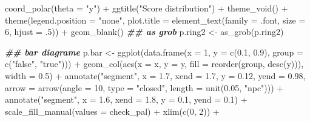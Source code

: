 \documentclass[
]{article}
\newenvironment{Shaded}{\begin{snugshade}}{\end{snugshade}}
\newcommand{\AttributeTok}[1]{\textcolor[rgb]{0.77,0.63,0.00}{#1}}
\newcommand{\DecValTok}[1]{\textcolor[rgb]{0.00,0.00,0.81}{#1}}
\newcommand{\DocumentationTok}[1]{\textcolor[rgb]{0.56,0.35,0.01}{\textbf{\textit{#1}}}}
\newcommand{\FloatTok}[1]{\textcolor[rgb]{0.00,0.00,0.81}{#1}}
\newcommand{\FunctionTok}[1]{\textcolor[rgb]{0.00,0.00,0.00}{#1}}
\newcommand{\NormalTok}[1]{#1}
\newcommand{\OtherTok}[1]{\textcolor[rgb]{0.56,0.35,0.01}{#1}}
\newcommand{\SpecialCharTok}[1]{\textcolor[rgb]{0.00,0.00,0.00}{#1}}
\newcommand{\StringTok}[1]{\textcolor[rgb]{0.31,0.60,0.02}{#1}}
\begin{document}
\begin{Shaded}
\begin{Highlighting}[]
  \FunctionTok{coord\_polar}\NormalTok{(}\AttributeTok{theta =} \StringTok{"y"}\NormalTok{) }\SpecialCharTok{+}
  \FunctionTok{ggtitle}\NormalTok{(}\StringTok{"Score distribution"}\NormalTok{) }\SpecialCharTok{+}
  \FunctionTok{theme\_void}\NormalTok{() }\SpecialCharTok{+}
  \FunctionTok{theme}\NormalTok{(}\AttributeTok{legend.position =} \StringTok{"none"}\NormalTok{,}
    \AttributeTok{plot.title =} \FunctionTok{element\_text}\NormalTok{(}\AttributeTok{family =}\NormalTok{ .font, }\AttributeTok{size =} \DecValTok{6}\NormalTok{, }\AttributeTok{hjust =}\NormalTok{ .}\DecValTok{5}\NormalTok{)) }\SpecialCharTok{+}
  \FunctionTok{geom\_blank}\NormalTok{()}
\DocumentationTok{\#\# as grob}
\NormalTok{p.ring2 }\OtherTok{\textless{}{-}} \FunctionTok{as\_grob}\NormalTok{(p.ring2)}

\DocumentationTok{\#\# bar diagrame}
\NormalTok{p.bar }\OtherTok{\textless{}{-}} \FunctionTok{ggplot}\NormalTok{(}\FunctionTok{data.frame}\NormalTok{(}\AttributeTok{x =} \DecValTok{1}\NormalTok{, }\AttributeTok{y =} \FunctionTok{c}\NormalTok{(}\FloatTok{0.1}\NormalTok{, }\FloatTok{0.9}\NormalTok{), }\AttributeTok{group =} \FunctionTok{c}\NormalTok{(}\StringTok{"false"}\NormalTok{, }\StringTok{"true"}\NormalTok{))) }\SpecialCharTok{+}
  \FunctionTok{geom\_col}\NormalTok{(}\FunctionTok{aes}\NormalTok{(}\AttributeTok{x =}\NormalTok{ x, }\AttributeTok{y =}\NormalTok{ y, }\AttributeTok{fill =} \FunctionTok{reorder}\NormalTok{(group, }\FunctionTok{desc}\NormalTok{(y))), }\AttributeTok{width =} \FloatTok{0.5}\NormalTok{) }\SpecialCharTok{+}
  \FunctionTok{annotate}\NormalTok{(}\StringTok{"segment"}\NormalTok{, }\AttributeTok{x =} \FloatTok{1.7}\NormalTok{, }\AttributeTok{xend =} \FloatTok{1.7}\NormalTok{, }\AttributeTok{y =} \FloatTok{0.12}\NormalTok{, }\AttributeTok{yend =} \FloatTok{0.98}\NormalTok{,}
    \AttributeTok{arrow =} \FunctionTok{arrow}\NormalTok{(}\AttributeTok{angle =} \DecValTok{10}\NormalTok{, }\AttributeTok{type =} \StringTok{"closed"}\NormalTok{, }\AttributeTok{length =} \FunctionTok{unit}\NormalTok{(}\FloatTok{0.05}\NormalTok{, }\StringTok{"npc"}\NormalTok{))) }\SpecialCharTok{+}
  \FunctionTok{annotate}\NormalTok{(}\StringTok{"segment"}\NormalTok{, }\AttributeTok{x =} \FloatTok{1.6}\NormalTok{, }\AttributeTok{xend =} \FloatTok{1.8}\NormalTok{, }\AttributeTok{y =} \FloatTok{0.1}\NormalTok{, }\AttributeTok{yend =} \FloatTok{0.1}\NormalTok{) }\SpecialCharTok{+}
  \FunctionTok{scale\_fill\_manual}\NormalTok{(}\AttributeTok{values =}\NormalTok{ check\_pal) }\SpecialCharTok{+}
  \FunctionTok{xlim}\NormalTok{(}\FunctionTok{c}\NormalTok{(}\DecValTok{0}\NormalTok{, }\DecValTok{2}\NormalTok{)) }\SpecialCharTok{+}

\end{Highlighting}
\end{Shaded}
\end{document}
